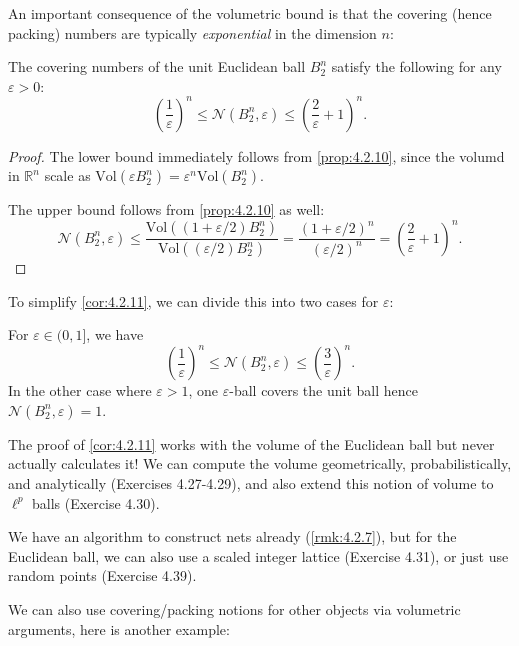 An important consequence of the volumetric bound is that the covering (hence packing) numbers are typically 
\textit{exponential} in the dimension $n$: 
\begin{corollary}
\label{cor:4.2.11}
The covering numbers of the unit Euclidean ball $B_2^n$ satisfy the following for any $\varepsilon > 0$: 
\[ \left( \frac{1}{\varepsilon} \right)^n \leq \mathcal{N}(B_2^n, \varepsilon) 
\leq \left( \frac{2}{\varepsilon} + 1 \right)^n. \]
\end{corollary}

\begin{proof}
The lower bound immediately follows from \cref{prop:4.2.10}, since the volumd in $\mathbb{R}^n$ scale as 
$\mathrm{Vol}(\varepsilon B_2^n) = \varepsilon^n \mathrm{Vol}(B_2^n)$.

The upper bound follows from \cref{prop:4.2.10} as well:
\[ \mathcal{N}(B_2^n, \varepsilon) \leq 
\frac{\mathrm{Vol}((1 + \varepsilon / 2)B_2^n)}{\mathrm{Vol}((\varepsilon / 2)B_2^n)} 
= \frac{(1 + \varepsilon / 2)^n}{(\varepsilon / 2)^n} 
= \left( \frac{2}{\varepsilon} + 1 \right)^n. \]
\end{proof}

To simplify \cref{cor:4.2.11}, we can divide this into two cases for $\varepsilon$:

For $\varepsilon \in (0, 1]$, we have 
\[ \left( \frac{1}{\varepsilon} \right)^n \leq \mathcal{N}(B_2^n, \varepsilon) 
\leq \left( \frac{3}{\varepsilon} \right)^n. \]
In the other case where $\varepsilon > 1$, one $\varepsilon$-ball covers the unit ball hence 
$\mathcal{N}(B_2^n, \varepsilon) = 1$.

\begin{remark}
\label{rmk:4.2.12}
The proof of \cref{cor:4.2.11} works with the volume of the Euclidean ball but never actually calculates it!
We can compute the volume geometrically, probabilistically, and analytically (Exercises 4.27-4.29), and 
also extend this notion of volume to $\ell^p$ balls (Exercise 4.30).
\end{remark}

\begin{remark}
\label{rmk:4.2.13}
We have an algorithm to construct nets already (\cref{rmk:4.2.7}), but for the Euclidean ball, we can also 
use a scaled integer lattice (Exercise 4.31), or just use random points (Exercise 4.39).
\end{remark}

We can also use covering/packing notions for other objects via volumetric arguments, here is another example:

